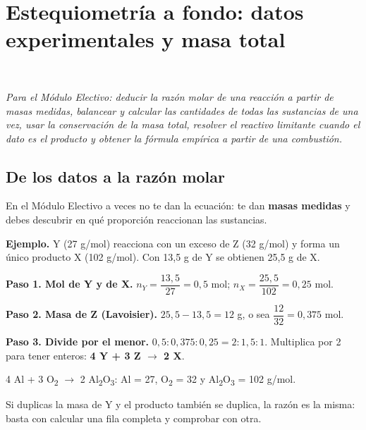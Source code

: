 \section[Estequiometría a fondo: datos experimentales y masa total (Mención)]{Estequiometría a fondo: datos experimentales y masa total}
\modmencion\ \ {\color{gris}\itshape Para el Módulo Electivo: deducir la razón molar de una reacción a partir de masas medidas, balancear y calcular las cantidades de todas las sustancias de una vez, usar la conservación de la masa total, resolver el reactivo limitante cuando el dato es el producto y obtener la fórmula empírica a partir de una combustión.\par}
\subsection{De los datos a la razón molar}
En el Módulo Electivo a veces no te dan la ecuación: te dan \textbf{masas medidas} y debes descubrir en qué proporción reaccionan las sustancias.

 

\textbf{Ejemplo.} Y (27 g/mol) reacciona con un exceso de Z (32 g/mol) y forma un único producto X (102 g/mol). Con 13,5 g de Y se obtienen 25,5 g de X.

 

\textbf{Paso 1. Mol de Y y de X.} $n_Y = \dfrac{13{,}5}{27} = 0{,}5$ mol; $n_X = \dfrac{25{,}5}{102} = 0{,}25$ mol.

 

\textbf{Paso 2. Masa de Z (Lavoisier).} $25{,}5 - 13{,}5 = 12$ g, o sea $\dfrac{12}{32} = 0{,}375$ mol.

 

\textbf{Paso 3. Divide por el menor.} $0{,}5 : 0{,}375 : 0{,}25 = 2 : 1{,}5 : 1$. Multiplica por 2 para tener enteros: \textbf{4 Y + 3 Z \ensuremath{\rightarrow} 2 X}.

  
\begin{clave}[{Es la reacción}] 4 Al + 3 O\textsubscript{2} \ensuremath{\rightarrow} 2 Al\textsubscript{2}O\textsubscript{3}: Al = 27, O\textsubscript{2} = 32 y Al\textsubscript{2}O\textsubscript{3} = 102 g/mol.\end{clave}
 
\begin{clave} Si duplicas la masa de Y y el producto también se duplica, la razón es la misma: basta con calcular una fila completa y comprobar con otra.\end{clave}
 
